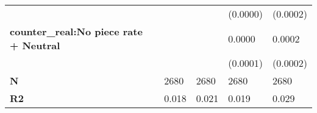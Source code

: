 \begin{tabular}{lllll}
                                           &                &                &       (0.0000) &       (0.0002) \\
\textbf{counter\_real:No piece rate + Neutral      } &                &                &         0.0000 &         0.0002 \\
                                           &                &                &       (0.0001) &       (0.0002) \\
\textbf{N                                         } &           2680 &           2680 &           2680 &           2680 \\
\textbf{R2                                        } &          0.018 &          0.021 &          0.019 &          0.029 \\
\bottomrule
\end{tabular}
